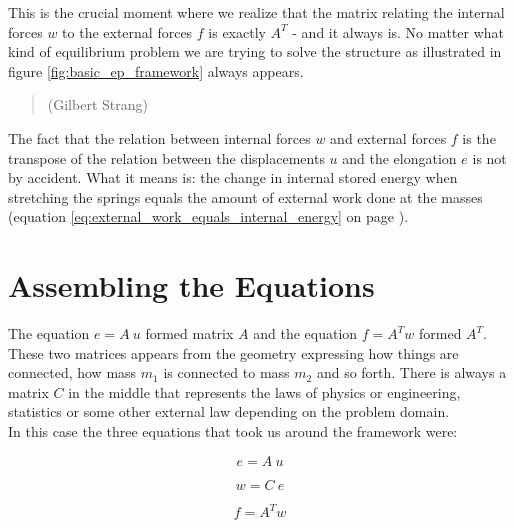 This is the crucial moment where we realize that the matrix relating
the internal forces $w$ to the external forces $f$ is exactly
$A^T$ - and it always is. No matter what kind of equilibrium problem we
are trying to solve the structure as illustrated in figure
\vref{fig:basic_ep_framework} always appears. 

\begin{quote}
(Gilbert Strang)
\end{quote}

The fact that the
relation between internal forces $w$ and external forces $f$ is the
transpose of the relation between the displacements $u$ and the
elongation $e$ is not by accident. What it means is: the change in
internal stored energy when stretching the springs equals the amount
of external work done at the masses (equation
\eqref{eq:external_work_equals_internal_energy} on page
\pageref{eq:external_work_equals_internal_energy}). \\  

\section{Assembling the Equations}
The equation $e = A \ u$ formed matrix $A$ and the equation $f = A^T w$ formed $A^T$.
These two matrices appears from the geometry expressing how things are
connected, how mass $m_1$ is connected to mass $m_2$ and so forth.
There is always a matrix $C$ in the middle that represents the laws of
physics or engineering, statistics or some other external law
depending on the problem domain. \\

In this case the three equations that
took us around the framework were:

\begin{equation}
\label{eq:e_a_u}
e = A \ u 
\end{equation}

\begin{equation}
\label{eq:w_c_e}
w = C \ e 
\end{equation}

\begin{equation}
\label{eq:f_at_w}
f = A^T  w
\end{equation}


